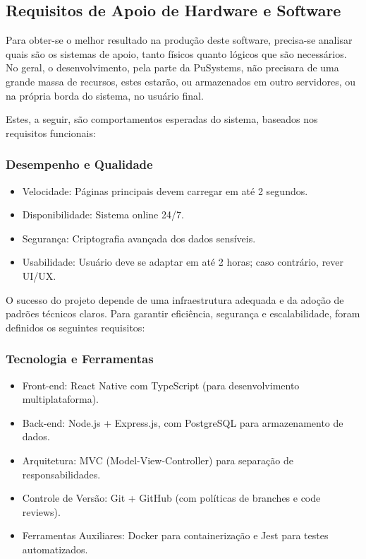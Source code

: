 \documentclass[a4paper, 12pt]{article}
\begin{document}
\subsection{Requisitos de Apoio de Hardware e Software}

Para obter-se o melhor resultado na produção deste software, precisa-se analisar quais são os sistemas de apoio, tanto físicos quanto lógicos que são necessários. No geral, o desenvolvimento, pela parte da PuSystems, não precisara de uma grande massa de recursos, estes estarão, ou armazenados em outro servidores, ou na própria borda do sistema, no usuário final. 

Estes, a seguir, são comportamentos esperadas do sistema, baseados nos requisitos funcionais: 

\subsubsection{Desempenho e Qualidade}
\begin{itemize}[label=--]
  \item Velocidade: Páginas principais devem carregar em até 2 segundos.
  \item Disponibilidade: Sistema online 24/7.
  \item Segurança: Criptografia avançada dos dados sensíveis.
  \item Usabilidade: Usuário deve se adaptar em até 2 horas; caso contrário, rever UI/UX.
\end{itemize}

O sucesso do projeto depende de uma infraestrutura adequada e da adoção de padrões técnicos claros. Para garantir eficiência, segurança e escalabilidade, foram definidos os seguintes requisitos:

\subsubsection{Tecnologia e Ferramentas}
\begin{itemize}[]
\item Front-end: React Native com TypeScript (para desenvolvimento multiplataforma).
\item Back-end: Node.js + Express.js, com PostgreSQL para armazenamento de dados.
\item Arquitetura: MVC (Model-View-Controller) para separação de responsabilidades.
\item Controle de Versão: Git + GitHub (com políticas de branches e code reviews).
\item Ferramentas Auxiliares: Docker para containerização e Jest para testes automatizados.
\end{itemize}
\end{document}

